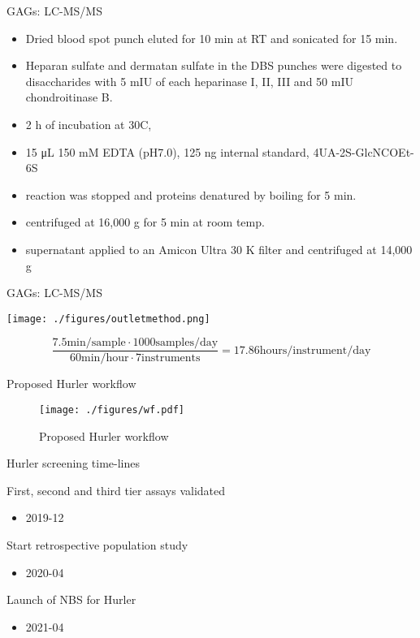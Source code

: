 \documentclass[presentation, smaller]{beamer}
\begin{document}
\begin{frame}[label={sec:org47b6e40}]{GAGs: LC-MS/MS}
\begin{itemize}
\item Dried blood spot punch eluted for 10 min at RT and sonicated for 15 min.
\item Heparan sulfate and dermatan sulfate in the DBS punches were
digested to disaccharides with 5 mIU of each heparinase I, II, III
and 50 mIU chondroitinase B.
\item 2 h of incubation at 30\degree C,
\item 15 μL 150 mM EDTA (pH7.0), 125 ng internal standard, 4UA-2S-GlcNCOEt-6S
\item reaction was stopped and proteins denatured by boiling for 5 min.
\item centrifuged at 16,000 g for 5 min at room temp.
\item supernatant applied to an Amicon Ultra 30 K filter and centrifuged at 14,000 g
\end{itemize}
\end{frame}

\begin{frame}[label={sec:orge07798a}]{GAGs: LC-MS/MS}
\begin{center}
\texttt{[image: ./figures/outletmethod.png]}
\end{center}


\[
\frac{7.5 \text{min/sample} \cdot 1000 \text{samples/day}}{60 \text{min/hour} \cdot 7 \text{instruments}}
= 17.86 \text{hours/instrument/day}
\]
\end{frame}

\begin{frame}[label={sec:orge067d56}]{Proposed Hurler workflow}
\begin{figure}[htbp]
\centering
\texttt{[image: ./figures/wf.pdf]}
\caption{\label{fig:org3f8c0f3}
Proposed Hurler workflow}
\end{figure}
\end{frame}

\begin{frame}[label={sec:org0672c8f}]{Hurler screening time-lines}
\begin{block}{First, second and third tier assays validated}
\begin{itemize}
\item 2019-12
\end{itemize}
\end{block}
\begin{block}{Start retrospective population study}
\begin{itemize}
\item 2020-04
\end{itemize}
\end{block}
\begin{block}{Launch of NBS for Hurler}
\begin{itemize}
\item 2021-04
\end{itemize}
\end{block}
\end{frame}
\end{document}
